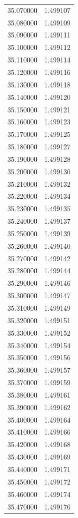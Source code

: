 \begin{tabular}{rr}
35.070000 & 1.499107 \\
35.080000 & 1.499109 \\
35.090000 & 1.499111 \\
35.100000 & 1.499112 \\
35.110000 & 1.499114 \\
35.120000 & 1.499116 \\
35.130000 & 1.499118 \\
35.140000 & 1.499120 \\
35.150000 & 1.499121 \\
35.160000 & 1.499123 \\
35.170000 & 1.499125 \\
35.180000 & 1.499127 \\
35.190000 & 1.499128 \\
35.200000 & 1.499130 \\
35.210000 & 1.499132 \\
35.220000 & 1.499134 \\
35.230000 & 1.499135 \\
35.240000 & 1.499137 \\
35.250000 & 1.499139 \\
35.260000 & 1.499140 \\
35.270000 & 1.499142 \\
35.280000 & 1.499144 \\
35.290000 & 1.499146 \\
35.300000 & 1.499147 \\
35.310000 & 1.499149 \\
35.320000 & 1.499151 \\
35.330000 & 1.499152 \\
35.340000 & 1.499154 \\
35.350000 & 1.499156 \\
35.360000 & 1.499157 \\
35.370000 & 1.499159 \\
35.380000 & 1.499161 \\
35.390000 & 1.499162 \\
35.400000 & 1.499164 \\
35.410000 & 1.499166 \\
35.420000 & 1.499168 \\
35.430000 & 1.499169 \\
35.440000 & 1.499171 \\
35.450000 & 1.499172 \\
35.460000 & 1.499174 \\
35.470000 & 1.499176 \\

\end{tabular}

